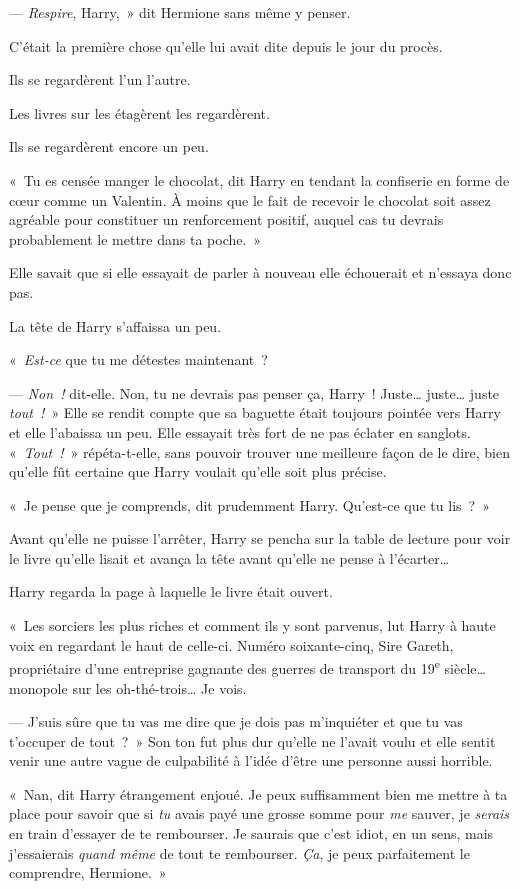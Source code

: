 --- \emph{Respire}, Harry,~» dit Hermione sans même y penser.

C'était la première chose qu'elle lui avait dite depuis le jour du procès.

Ils se regardèrent l'un l'autre.

Les livres sur les étagèrent les regardèrent.

Ils se regardèrent encore un peu.

«~Tu es censée manger le chocolat, dit Harry en tendant la confiserie en forme de cœur comme un Valentin. À moins que le fait de recevoir le chocolat soit assez agréable pour constituer un renforcement positif, auquel cas tu devrais probablement le mettre dans ta poche.~»

Elle savait que si elle essayait de parler à nouveau elle échouerait et n'essaya donc pas.

La tête de Harry s'affaissa un peu.

«~\emph{Est-ce} que tu me détestes maintenant~?

--- \emph{Non~!} dit-elle. Non, tu ne devrais pas penser ça, Harry~! Juste… juste… juste \emph{tout~!}~» Elle se rendit compte que sa baguette était toujours pointée vers Harry et elle l'abaissa un peu. Elle essayait très fort de ne pas éclater en sanglots. «~\emph{Tout~!}~» répéta-t-elle, sans pouvoir trouver une meilleure façon de le dire, bien qu'elle fût certaine que Harry voulait qu'elle soit plus précise.

«~Je pense que je comprends, dit prudemment Harry. Qu'est-ce que tu lis~?~»

Avant qu'elle ne puisse l'arrêter, Harry se pencha sur la table de lecture pour voir le livre qu'elle lisait et avança la tête avant qu'elle ne pense à l'écarter…

Harry regarda la page à laquelle le livre était ouvert.

«~Les sorciers les plus riches et comment ils y sont parvenus, lut Harry à haute voix en regardant le haut de celle-ci. Numéro soixante-cinq, Sire Gareth, propriétaire d'une entreprise gagnante des guerres de transport du 19\textsuperscript{e} siècle… monopole sur les oh-thé-trois… Je vois.

--- J'suis sûre que tu vas me dire que je dois pas m'inquiéter et que tu vas t'occuper de tout~?~» Son ton fut plus dur qu'elle ne l'avait voulu et elle sentit venir une autre vague de culpabilité à l'idée d'être une personne aussi horrible.

«~Nan, dit Harry étrangement enjoué. Je peux suffisamment bien me mettre à ta place pour savoir que si \emph{tu} avais payé une grosse somme pour \emph{me} sauver, je \emph{serais} en train d'essayer de te rembourser. Je saurais que c'est idiot, en un sens, mais j'essaierais \emph{quand même} de tout te rembourser. \emph{Ça}, je peux parfaitement le comprendre, Hermione.~»

